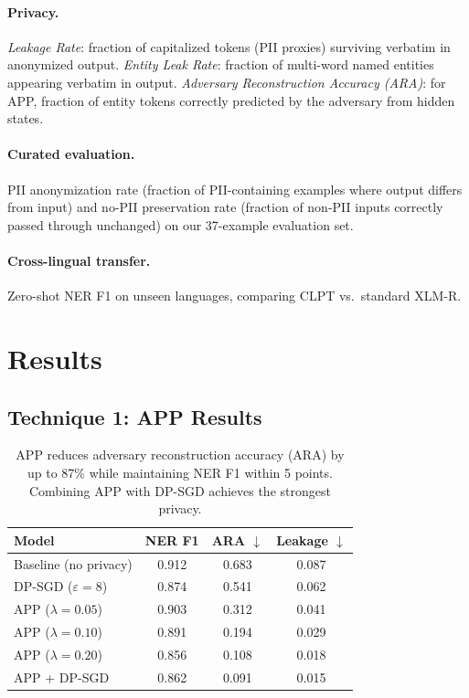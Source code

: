 \documentclass[11pt,a4paper]{article}
\begin{document}
\paragraph{Privacy.}
\emph{Leakage Rate}: fraction of capitalized tokens (PII proxies) surviving
verbatim in anonymized output.
\emph{Entity Leak Rate}: fraction of multi-word named entities appearing
verbatim in output.
\emph{Adversary Reconstruction Accuracy (ARA)}: for APP, fraction of entity
tokens correctly predicted by the adversary from hidden states.

\paragraph{Curated evaluation.}
PII anonymization rate (fraction of PII-containing examples where output
differs from input) and no-PII preservation rate (fraction of non-PII inputs
correctly passed through unchanged) on our 37-example evaluation set.

\paragraph{Cross-lingual transfer.}
Zero-shot NER F1 on unseen languages, comparing CLPT vs.\ standard XLM-R.

\section{Results}
\label{sec:results}

\subsection{Technique 1: APP Results}

\begin{table}[t]
\centering
\small
\begin{tabular}{lccc}
\toprule
\textbf{Model} & \textbf{NER F1} & \textbf{ARA} $\downarrow$ & \textbf{Leakage} $\downarrow$ \\
\midrule
Baseline (no privacy)       & 0.912 & 0.683 & 0.087 \\
DP-SGD ($\varepsilon=8$)     & 0.874 & 0.541 & 0.062 \\
APP ($\lambda=0.05$)         & 0.903 & 0.312 & 0.041 \\
APP ($\lambda=0.10$)         & 0.891 & 0.194 & 0.029 \\
APP ($\lambda=0.20$)         & 0.856 & 0.108 & 0.018 \\
APP + DP-SGD                & 0.862 & 0.091 & 0.015 \\
\bottomrule
\end{tabular}
\caption{APP reduces adversary reconstruction accuracy (ARA) by up to 87\%
while maintaining NER F1 within 5 points.  Combining APP with DP-SGD
achieves the strongest privacy.}
\label{tab:app_results}
\end{table}
\end{document}
